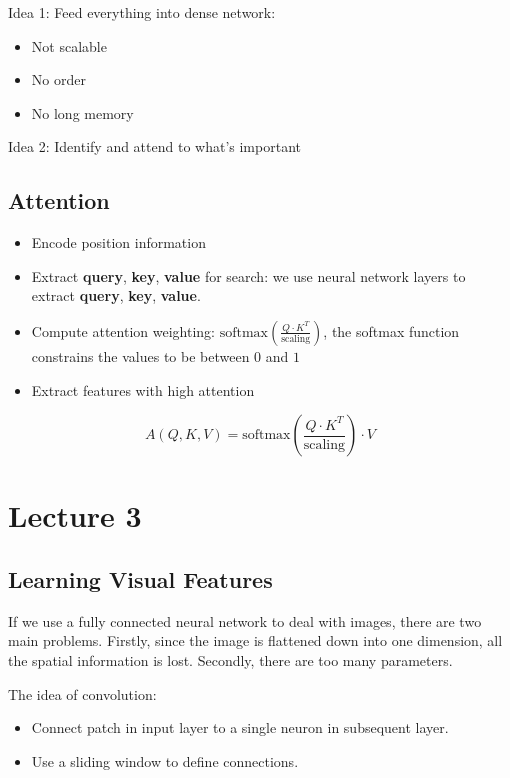 \documentclass[12pt, a4paper, oneside]{article}
\begin{document}
Idea 1: Feed everything into dense network:
\begin{itemize}
    \item Not scalable
    \item No order
    \item No long memory
\end{itemize}

Idea 2: Identify and attend to what's important

\subsection{Attention}

\begin{itemize}
    \item Encode position information
    \item Extract \textbf{query}, \textbf{key}, \textbf{value} for search: we use neural network layers to extract \textbf{query}, \textbf{key}, \textbf{value}.
    \item Compute attention weighting: $\text{softmax}(\frac{Q\cdot K^{T}}{\text{scaling}})$, the softmax function constrains the values to be between $0$ and $1$
    \item Extract features with high attention
\end{itemize}

\begin{equation*}
    A(Q,K,V)=\text{softmax}(\frac{Q\cdot K^{T}}{\text{scaling}})\cdot V
\end{equation*}

\section{Lecture 3}

\subsection{Learning Visual Features}

If we use a fully connected neural network to deal with images, there are two main problems. Firstly, since the image is flattened down into one dimension, all the spatial information is lost. Secondly, there are too many parameters.

The idea of convolution:
\begin{itemize}
    \item Connect patch in input layer to a single neuron in subsequent layer.
    \item Use a sliding window to define connections.
\end{itemize}
\end{document}
